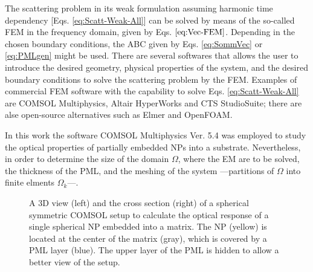 
The scattering problem in its weak formulation assuming harmonic time dependency [Eqs. \eqref{eq:Scatt-Weak-All}] can be solved by means of the so-called FEM in the frequency domain, given by Eqs. $\eqref{eq:Vec-FEM}$. Depending in the chosen boundary conditions, the ABC given by Eqs. \eqref{eq:SommVec} or \eqref{eq:PMLgen} might be used. There are several softwares that allows the user to introduce the desired geometry, physical properties of the system, and the desired boundary conditions to solve the scattering problem by the FEM. Examples of commercial FEM software with the capability to solve Eqs. \eqref{eq:Scatt-Weak-All} are COMSOL Multiphysics, Altair HyperWorks and CTS StudioSuite; there are alse open-source alternatives such as Elmer and OpenFOAM.

In this work the software COMSOL Multiphysics Ver. 5.4 was employed to study the optical properties of partially embedded NPs into a substrate. Nevertheless, in order to determine the size of the domain $\Omega$, where the EM are to be solved, the thickness of the PML, and the meshing of the system ---partitions of $\Omega$ into finite elments $\Omega_k$---.




\begin{figure}
	\centering
	\def\svgwidth{.8\textwidth} \small
{}
\vspace*{0em}
\caption[Spherical symmetric COMSOL Setup]{A 3D view (left) and the cross section (right) of a spherical symmetric COMSOL setup to calculate the optical response of a single spherical NP embedded into a matrix. The NP (yellow) is located at the center of the matrix (gray), which is covered by a PML layer (blue). The upper layer of the PML is hidden to allow a better view of the setup.}
\label{fig:setup:sphere}
\end{figure}


